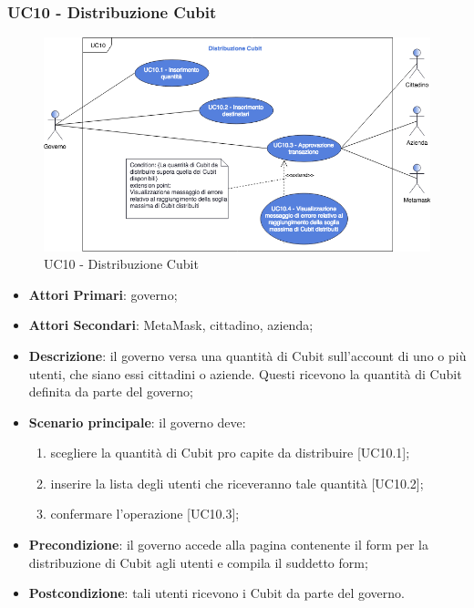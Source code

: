 \subsubsection{UC10 - Distribuzione Cubit}
\begin{figure}[h]
	\includegraphics[width=13.5cm]{res/images/UC10Distribuzione.png} %
	\centering
	\caption{UC10 - Distribuzione Cubit}
	
\end{figure}
\begin{itemize}
	\item \textbf{Attori Primari}: governo;
	\item \textbf{Attori Secondari}: MetaMask\glo, cittadino, azienda\glo;
	\item \textbf{Descrizione}: il governo versa una quantità di Cubit sull'account di uno o più  utenti, che siano essi cittadini o aziende. Questi ricevono la quantità di Cubit definita da parte del governo;
	\item \textbf{Scenario principale}: il governo deve:
	 \begin{enumerate}[label=\alph*.]
		\item scegliere la quantità di Cubit pro capite da distribuire [UC10.1];
		\item inserire la lista degli utenti che riceveranno tale quantità [UC10.2];
		\item confermare l'operazione [UC10.3];
	\end{enumerate}

	\item \textbf{Precondizione}: il governo accede alla pagina contenente il form per la distribuzione di Cubit agli utenti e compila il suddetto form;
	\item \textbf{Postcondizione}: tali utenti ricevono i Cubit da parte del governo.
\end{itemize}
